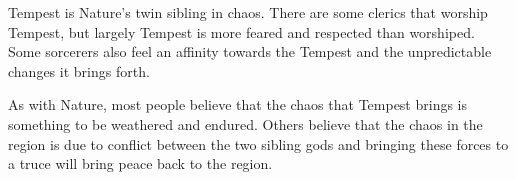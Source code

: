 Tempest is Nature's twin sibling in chaos.
There are some clerics that worship Tempest, but largely Tempest is more feared and respected than worshiped.
Some sorcerers also feel an affinity towards the Tempest and the unpredictable changes it brings forth.

As with Nature, most people believe that the chaos that Tempest brings is something to be weathered and endured.
Others believe that the chaos in the region is due to conflict between the two sibling gods and bringing these forces to a truce will bring peace back to the region.
